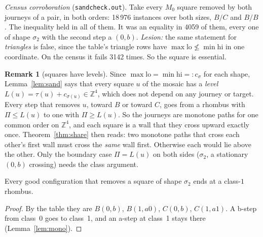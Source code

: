 \documentclass[11pt]{article}
\theoremstyle{definition}\newtheorem{definition}[theorem]{Definition}\newtheorem{remark}[theorem]{Remark}
\newcommand{\Z}{\mathbb Z}
\begin{document}
\noindent\emph{Census corroboration} (\texttt{sandcheck.out}). Take every $M_0$ square removed by both journeys of a pair, in both orders: 18\,976 instances over both sizes, $B/C$ and $B/B$. The inequality held in all of them. It was an equality in 4059 of them, every one of shape $\sigma_2$ with the second step a $(0,b)$. \emph{Lesion:} the same statement for \emph{triangles} is false, since the table's triangle rows have $\max\mathrm{lo}\not\le\min\mathrm{hi}$ in one coordinate. On the census it fails 3142 times. So the square is essential.

\begin{remark}[squares have levels]\label{rem:level}
Since $\max\mathrm{lo}=\min\mathrm{hi}=:c_\sigma$ for each shape, Lemma~\ref{lem:sand} says that every square $u$ of the mosaic has a \emph{level} $L(u)=\tau(u)+c_{\sigma(u)}\in\Z^4$, which does not depend on any journey or target. Every step that removes $u$, toward $B$ or toward $C$, goes from a rhombus with $\Pi\le L(u)$ to one with $\Pi\ge L(u)$. So the journeys are monotone paths for one common order on $\Z^4$, and each square is a wall that they cross upward exactly once. Theorem~\ref{thm:share} then reads: two monotone paths that cross each other's first wall must cross the \emph{same} wall first. Otherwise each would lie above the other. Only the boundary case $\Pi=L(u)$ on both sides ($\sigma_2$, a stationary $(0,b)$ crossing) needs the class argument.
\end{remark}

\begin{lemma}\label{lem:cls1}
Every good configuration that removes a square of shape $\sigma_2$ ends at a class-$1$ rhombus.
\end{lemma}
\begin{proof}
By the table they are $B(0,b)$, $B(1,a0)$, $C(0,b)$, $C(1,a1)$. A b-step from class~0 goes to class~1, and an a-step at class~1 stays there (Lemma~\ref{lem:mono}).
\end{proof}
\end{document}
